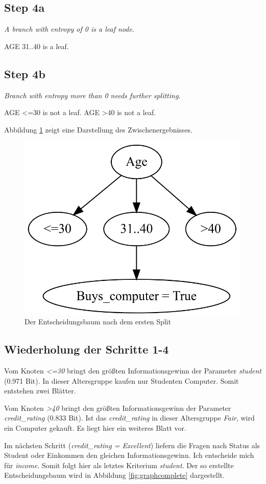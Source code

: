 \documentclass[11pt,a4paper]{article}
\begin{document}
\subsection*{Step 4a}
\textit{A branch with entropy of 0 is a leaf node.}

AGE 31..40 is a leaf.

\subsection*{Step 4b}
\textit{Branch with entropy more than 0 needs further splitting.}

AGE <=30 is not a leaf.
AGE >40 is not a leaf.

Abbildung \ref{fig:graphlevel1} zeigt eine Darstellung des Zwischenergebnisses.

\begin{figure}
	\centering
	\includegraphics[width=0.5\linewidth]{bilder/graph_level1}
	\caption{Der Entscheidungsbaum nach dem ersten Split}
	\label{fig:graphlevel1}
\end{figure}


\subsection*{Wiederholung der Schritte 1-4}

Vom Knoten \textit{<=30} bringt den größten Informationsgewinn der Parameter \textit{student} (0.971 Bit). In dieser Altersgruppe kaufen nur Studenten Computer. Somit entstehen zwei Blätter.

Vom Knoten \textit{>40} bringt den größten Informationsgewinn der Parameter \textit{credit\_rating} (0.833 Bit). Ist das \textit{credit\_rating} in dieser Altersgruppe \textit{Fair}, wird ein Computer gekauft. Es liegt hier ein weiteres Blatt vor.

Im nächsten Schritt (\textit{credit\_rating = Excellent}) liefern die Fragen nach Status als Student oder Einkommen den gleichen Informationsgewinn. Ich entscheide mich für \textit{income}. Somit folgt hier als letztes Kriterium \textit{student}. Der so erstellte Entscheidungsbaum wird in Abbildung \ref{fig:graphcomplete} dargestellt.
\end{document}
